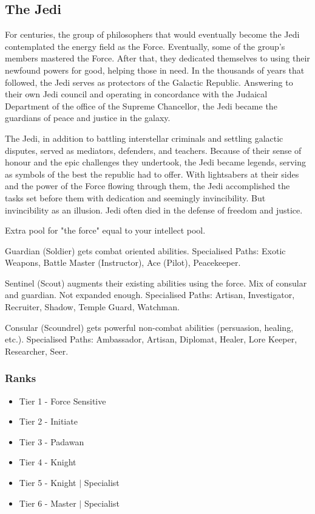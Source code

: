 \documentclass[a4paper,10pt,final,twocolumn,oneside]{book}
\begin{document}
\subsection{The Jedi} %
\label{sub:jedi}
For centuries, the group of philosophers that would eventually become the Jedi contemplated the energy field as the Force. Eventually, some of the group's members mastered the Force. After that, they dedicated themselves to using their newfound powers for good, helping those in need. In the thousands of years that followed, the Jedi serves as protectors of the Galactic Republic. Answering to their own Jedi council and operating in concordance with the Judaical Department of the office of the Supreme Chancellor, the Jedi became the guardians of peace and justice in the galaxy. \par 
The Jedi, in addition to battling interstellar criminals and settling galactic disputes, served as mediators, defenders, and teachers. Because of their sense of honour and the epic challenges they undertook, the Jedi became legends, serving as symbols of the best the republic had to offer. With lightsabers at their sides and the power of the Force flowing through them, the Jedi accomplished the tasks set before them with dedication and seemingly invincibility. But invincibility as an illusion. Jedi often died in the defense of freedom and justice.





Extra pool for "the force" equal to your intellect pool.

Guardian (Soldier) gets combat oriented abilities. Specialised Paths: Exotic Weapons, Battle Master (Instructor), Ace (Pilot), Peacekeeper.

Sentinel (Scout) augments their existing abilities using the force. Mix of consular and guardian. Not expanded enough. Specialised Paths: Artisan, Investigator, Recruiter, Shadow, Temple Guard, Watchman.

Consular (Scoundrel) gets powerful non-combat abilities (persuasion, healing, etc.). Specialised Paths: Ambassador, Artisan, Diplomat, Healer, Lore Keeper, Researcher, Seer.

\subsubsection*{Ranks}

\begin{itemize}
\item Tier 1 - Force Sensitive
\item Tier 2 - Initiate
\item Tier 3 - Padawan
\item Tier 4 - Knight
\item Tier 5 - Knight $|$ Specialist
\item Tier 6 - Master $|$ Specialist
\end{itemize}
\end{document}
